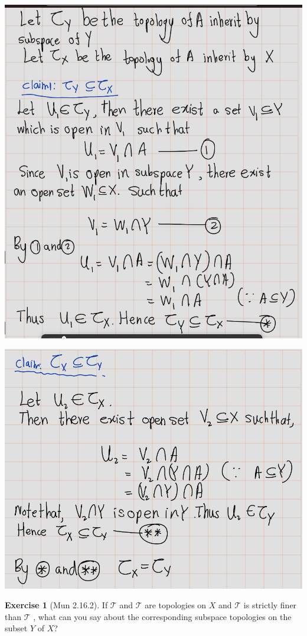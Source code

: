 \documentclass[
]{book}
\theoremstyle{definition}
\theoremstyle{definition}
\theoremstyle{definition}
\newtheorem{exercise}{Exercise}[chapter]
\theoremstyle{definition}
\theoremstyle{remark}
\begin{document}
\includegraphics{figures/Exercises/Ex 2.16/ex1-1.png}

\includegraphics{figures/Exercises/Ex 2.16/ex1-2.png}

\begin{exercise}[Mun 2.16.2]
\protect\hypertarget{exr:unnamed-chunk-93}{}\label{exr:unnamed-chunk-93}If \(\mathcal{T}\) and \(\mathcal{T}\) are topologies on \(X\) and \(\mathcal{T}\) is strictly finer than \(\mathcal{T}\) , what can you
say about the corresponding subspace topologies on the subset \(Y\) of \(X\)?
\end{exercise}
\end{document}
